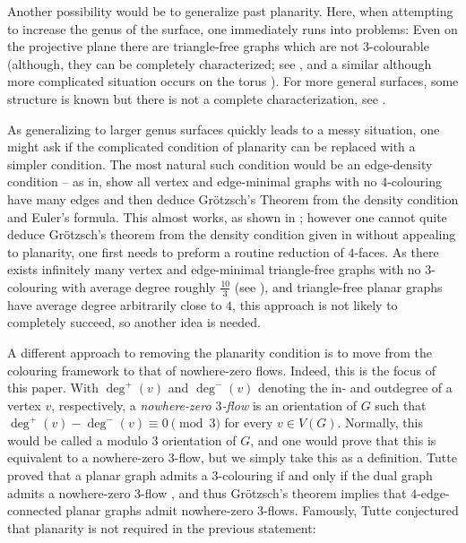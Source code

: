 \documentclass{article}
\begin{document}
Another possibility would be to
generalize past planarity. Here, when attempting to increase the genus of the
surface, one immediately runs into problems: Even on the projective plane there
are triangle-free graphs which are not $3$-colourable (although, they can be
completely characterized; see \cite{gimbelthomassentheorem}, and a similar
although more complicated situation occurs on the torus
\cite{torodialcharacterization}). For more general surfaces, some structure is
known but there is not a complete characterization, see \cite{trfree6,
trfree2,trfree3,trfree4,trfree7}.

As generalizing to larger genus surfaces
quickly leads to a messy situation, one might ask if the complicated condition
of planarity can be replaced with a simpler condition. The most natural such
condition would be an edge-density condition -- as in, show all vertex and
edge-minimal graphs with no $4$-colouring have many edges and then deduce
Gr\"{o}tzsch's Theorem from the density condition and Euler's formula. This
almost works, as shown in \cite{Shortproof}; however one cannot quite deduce
Grötzsch's theorem from the density condition given in \cite{Shortproof}
without appealing to planarity, one first needs to preform a routine reduction
of $4$-faces. As there exists infinitely many vertex and edge-minimal
triangle-free graphs with no $3$-colouring with average degree roughly
$\frac{10}{3}$ (see \cite{densityboundtrianglefree}), and triangle-free planar
graphs have average degree arbitrarily close to $4$, this approach is not
likely to completely succeed, so another idea is needed.

A different approach
to removing the planarity condition is to move from the colouring framework to
that of nowhere-zero flows. Indeed, this is the focus of this paper. With
$\deg^+(v)$ and $\deg^-(v)$ denoting the in- and outdegree of a vertex $v$,
respectively, a \emph{nowhere-zero $3$-flow}  is an orientation of $G$ such
that $\deg^+(v) -\deg^-(v) \equiv 0 \pmod 3$ for every $v \in V(G)$. Normally,
this would be called a modulo $3$ orientation of $G$, and one would prove that
this is equivalent to a nowhere-zero $3$-flow, but we simply take this as a
definition.  Tutte proved that a planar graph admits a $3$-colouring if and
only if the dual graph admits a nowhere-zero $3$-flow
\cite{tutte1954contribution}, and thus Grötzsch's theorem implies that
$4$-edge-connected planar graphs admit nowhere-zero $3$-flows. Famously, Tutte
conjectured that planarity is not required in the previous statement:
\end{document}
